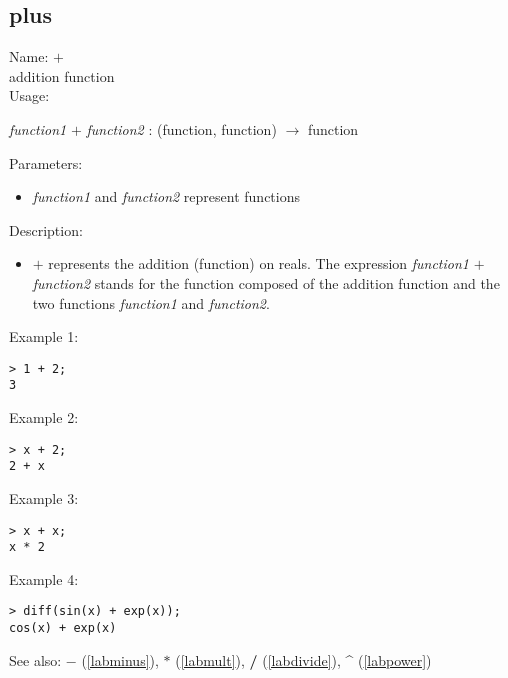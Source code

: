 \subsection{plus}
\label{labplus}
\noindent Name: \textbf{$+$}\\
addition function\\

\noindent Usage: 
\begin{center}
\emph{function1} \textbf{$+$} \emph{function2} : (\textsf{function}, \textsf{function}) $\rightarrow$ \textsf{function}\\
\end{center}
Parameters: 
\begin{itemize}
\item \emph{function1} and \emph{function2} represent functions
\end{itemize}
\noindent Description: \begin{itemize}

\item \textbf{$+$} represents the addition (function) on reals. 
   The expression \emph{function1} \textbf{$+$} \emph{function2} stands for
   the function composed of the addition function and the two
   functions \emph{function1} and \emph{function2}.
\end{itemize}
\noindent Example 1: 
\begin{center}\begin{minipage}{15cm}\begin{Verbatim}[frame=single]
> 1 + 2;
3
\end{Verbatim}
\end{minipage}\end{center}
\noindent Example 2: 
\begin{center}\begin{minipage}{15cm}\begin{Verbatim}[frame=single]
> x + 2;
2 + x
\end{Verbatim}
\end{minipage}\end{center}
\noindent Example 3: 
\begin{center}\begin{minipage}{15cm}\begin{Verbatim}[frame=single]
> x + x;
x * 2
\end{Verbatim}
\end{minipage}\end{center}
\noindent Example 4: 
\begin{center}\begin{minipage}{15cm}\begin{Verbatim}[frame=single]
> diff(sin(x) + exp(x));
cos(x) + exp(x)
\end{Verbatim}
\end{minipage}\end{center}
See also: \textbf{$-$} (\ref{labminus}), \textbf{$*$} (\ref{labmult}), \textbf{/} (\ref{labdivide}), \textbf{\^} (\ref{labpower})
